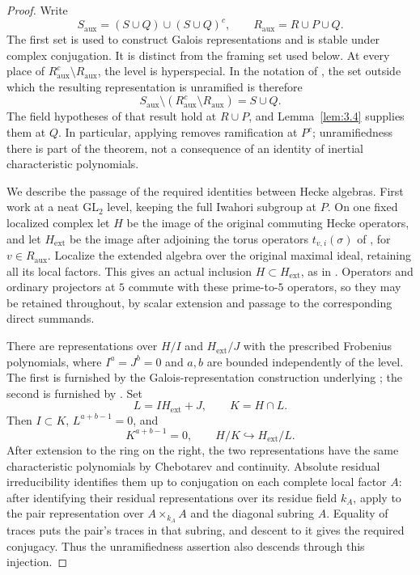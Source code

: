 \documentclass[11pt,a4paper]{article}
\numberwithin{equation}{section}
\begin{document}
\begin{proof}
Write
\begin{equation*}
S_{\mathrm{aux}}=(S\cup Q)\cup(S\cup Q)^c,
\qquad R_{\mathrm{aux}}=R\cup P\cup Q.
\end{equation*}
The first set is used to construct Galois representations and is stable under complex conjugation. It is distinct from the framing set used below. At every place of \(R_{\mathrm{aux}}^c\setminus R_{\mathrm{aux}}\), the level is hyperspecial. In the notation of \cite[\S3.1]{ACC}, the set outside which the resulting representation is unramified is therefore
\begin{equation*}
S_{\mathrm{aux}}\setminus
 (R_{\mathrm{aux}}^c\setminus R_{\mathrm{aux}})=S\cup Q.
\end{equation*}
The field hypotheses of that result hold at \(R\cup P\), and Lemma~\ref{lem:3.4} supplies them at \(Q\). In particular, applying \cite[Theorem~3.1.1]{ACC} removes ramification at \(P^c\); unramifiedness there is part of the theorem, not a consequence of an identity of inertial characteristic polynomials.

We describe the passage of the required identities between Hecke algebras. First work at a neat \(\mathrm{GL}_2\) level, keeping the full Iwahori subgroup at \(P\). On one fixed localized complex let \(H\) be the image of the original commuting Hecke operators, and let \(H_{\mathrm{ext}}\) be the image after adjoining the torus operators \(t_{v,i}(\sigma)\) of \cite[\S2.2.4]{ACC}, for \(v\in R_{\mathrm{aux}}\). Localize the extended algebra over the original maximal ideal, retaining all its local factors. This gives an actual inclusion \(H\subset H_{\mathrm{ext}}\), as in \cite[\S3.1]{ACC}. Operators and ordinary projectors at \(5\) commute with these prime-to-\(5\) operators, so they may be retained throughout, by scalar extension and passage to the corresponding direct summands.

There are representations over \(H/I\) and \(H_{\mathrm{ext}}/J\) with the prescribed Frobenius polynomials, where \(I^a=J^b=0\) and \(a,b\) are bounded independently of the level. The first is furnished by the Galois-representation construction underlying \cite[Proposition~5.5.2]{CN}; the second is furnished by \cite[Theorem~3.1.1]{ACC}. Set
\begin{equation*}
L=IH_{\mathrm{ext}}+J,
\qquad K=H\cap L.
\end{equation*}
Then \(I\subset K\), \(L^{a+b-1}=0\), and
\begin{equation*}
K^{a+b-1}=0,
\qquad H/K\hookrightarrow H_{\mathrm{ext}}/L.
\end{equation*}
After extension to the ring on the right, the two representations have the same characteristic polynomials by Chebotarev and continuity. Absolute residual irreducibility identifies them up to conjugation on each complete local factor \(A\): after identifying their residual representations over its residue field \(k_A\), apply \cite[Lemma~2.1.10]{CHT} to the pair representation over \(A\times_{k_A}A\) and the diagonal subring \(A\). Equality of traces puts the pair's traces in that subring, and descent to it gives the required conjugacy. Thus the unramifiedness assertion also descends through this injection.


\end{proof}
\end{document}
